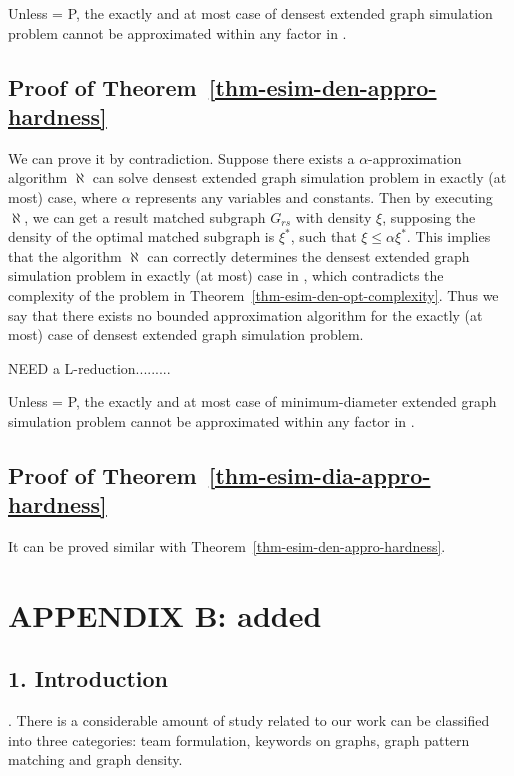\begin{theorem}
\label{thm-esim-den-appro-hardness}
Unless \NP = P, the exactly and at most case of densest extended graph simulation problem cannot be approximated within any factor in \PTIME.
\end{theorem}

\subsection*{Proof of Theorem~\ref{thm-esim-den-appro-hardness}}
We can prove it by contradiction. Suppose there exists a \PTIME $\alpha$-approximation algorithm $\aleph$ can solve densest extended graph simulation problem in exactly (at most) case, where $\alpha$ represents any variables and constants. Then by executing $\aleph$, we can get a result matched subgraph $G_{rs}$ with density $\xi$, supposing the density of the optimal matched subgraph is $\xi^*$, such that $\xi\leq\alpha\xi^*$. This implies that the algorithm $\aleph$ can correctly determines the densest extended graph simulation problem in exactly (at most) case in \PTIME, which contradicts the complexity of the problem in Theorem~\ref{thm-esim-den-opt-complexity}. Thus we say that there exists no bounded approximation algorithm for the exactly (at most) case of densest extended graph simulation problem.

NEED a L-reduction.........

\begin{theorem}
\label{thm-esim-dia-appro-hardness}
Unless \NP = P, the exactly and at most case of minimum-diameter extended graph simulation problem cannot be approximated within any factor in \PTIME.
\end{theorem}

\subsection*{Proof of Theorem~\ref{thm-esim-dia-appro-hardness}}
It can be proved similar with Theorem~\ref{thm-esim-den-appro-hardness}.

\section*{{\Large \sf APPENDIX B: added}}

\subsection*{1. Introduction}
.
There is a considerable amount of study related to our work can be classified into three categories: team formulation, keywords on graphs, graph pattern matching and graph density.


